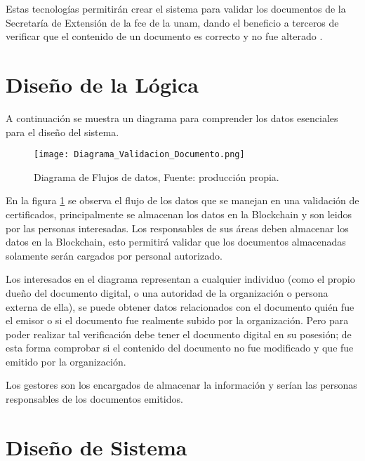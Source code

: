 Estas tecnologías permitirán crear el sistema para validar los documentos de la Secretaría de Extensión de la \gls{fce} de la \gls{unam}, dando el beneficio 
a terceros de verificar que el contenido de un documento  es correcto y no fue alterado \cite[]{brys_cadena_2019}. 

\section{Diseño de la Lógica}
A continuación se muestra un diagrama para comprender los datos  esenciales para el diseño del sistema.

\begin{figure}[H]
  \centering
  {\texttt{[image: Diagrama\_Validacion\_Documento.png]}}
  \caption{Diagrama de Flujos de datos, Fuente: producción propia.}
  \label{img:flujo-datos}
\end{figure}

En la figura \ref{img:flujo-datos} se observa el flujo de los datos que se manejan en una validación de certificados, principalmente se almacenan los datos en la Blockchain y son leidos por las personas interesadas. Los responsables 
de sus áreas deben  almacenar los datos en la Blockchain, esto permitirá validar que los documentos almacenadas solamente
serán cargados por personal autorizado.    


Los interesados en el diagrama representan a cualquier individuo (como el propio dueño del documento digital, o una autoridad de la organización o persona externa de ella), 
se puede obtener datos relacionados con el documento quién fue el emisor o si el documento fue realmente subido por la organización. 
Pero para poder realizar tal verificación debe tener el documento digital en su posesión; de esta forma comprobar si 
el contenido del documento no fue modificado y que fue emitido por la organización.

Los gestores son los encargados de almacenar la información y serían las personas responsables 
de los documentos emitidos.

\section{Diseño de Sistema}\label{s:system_design}

